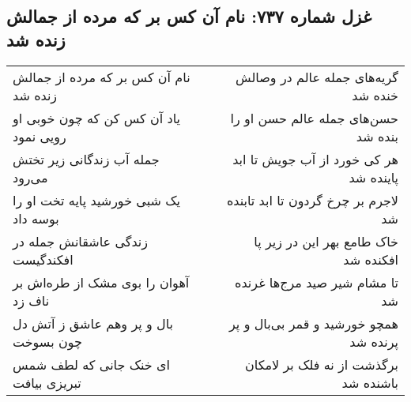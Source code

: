 \begin{center}
\section*{غزل شماره ۷۳۷: نام آن کس بر که مرده از جمالش زنده شد}
\label{sec:0737}
\begin{longtable}{l p{0.5cm} r}
نام آن کس بر که مرده از جمالش زنده شد
&&
گریه‌های جمله عالم در وصالش خنده شد
\\
یاد آن کس کن که چون خوبی او رویی نمود
&&
حسن‌های جمله عالم حسن او را بنده شد
\\
جمله آب زندگانی زیر تختش می‌رود
&&
هر کی خورد از آب جویش تا ابد پاینده شد
\\
یک شبی خورشید پایه تخت او را بوسه داد
&&
لاجرم بر چرخ گردون تا ابد تابنده شد
\\
زندگی عاشقانش جمله در افکندگیست
&&
خاک طامع بهر این در زیر پا افکنده شد
\\
آهوان را بوی مشک از طره‌اش بر ناف زد
&&
تا مشام شیر صید مرج‌ها غرنده شد
\\
بال و پر وهم عاشق ز آتش دل چون بسوخت
&&
همچو خورشید و قمر بی‌بال و پر پرنده شد
\\
ای خنک جانی که لطف شمس تبریزی بیافت
&&
برگذشت از نه فلک بر لامکان باشنده شد
\\
\end{longtable}
\end{center}
